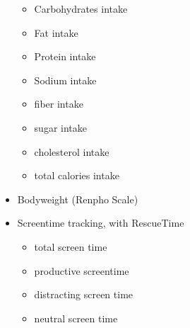 \documentclass[conference]{IEEEtran}
\begin{document}
\begin{itemize}
\begin{itemize}
\item Carbohydrates intake
\item Fat intake
\item Protein intake
\item Sodium intake
\item fiber intake
\item sugar intake
\item cholesterol intake
\item total calories intake
\end{itemize}
\item Bodyweight (Renpho Scale) 
\item Screentime tracking, with RescueTime
   \begin{itemize}
\item total screen time
\item productive screentime
\item distracting screen time
\item neutral screen time
\end{itemize}
\end{itemize}
\end{document}
